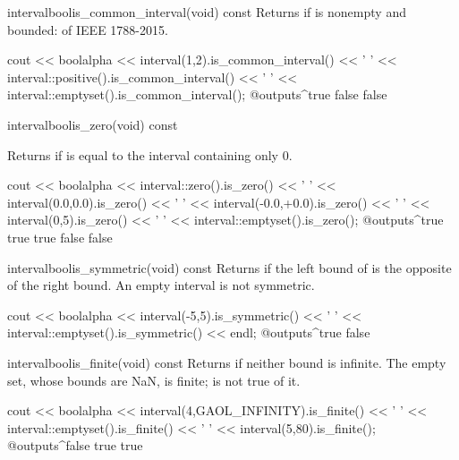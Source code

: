 \documentclass[12pt,a4paper,twoside,openright]{book}
\begin{document}
\begin{defmethod}{interval}{bool}{is\_common\_interval}{(void) const}
  Returns  if  is nonempty and bounded:
   of IEEE 1788-2015.\newinvfive
  \begin{example}
cout << boolalpha << interval(1,2).is_common_interval() << ' '
     << interval::positive().is_common_interval() << ' '
     << interval::emptyset().is_common_interval();
@outputs^true false false~
  \end{example}
\end{defmethod}

\begin{defmethod}{interval}{bool}{is\_zero}{(void) const}
  \begin{operation}
  \end{operation}
  Returns  if  is equal to the interval containing
  only $0$.
  \begin{example}
cout << boolalpha << interval::zero().is_zero() << ' '
     << interval(0.0,0.0).is_zero() << ' '
     << interval(-0.0,+0.0).is_zero() << ' '
     << interval(0,5).is_zero() << ' '
     << interval::emptyset().is_zero();
@outputs^true true true false false~
  \end{example}
\end{defmethod}

\begin{defmethod}{interval}{bool}{is\_symmetric}{(void) const}
  Returns  if the left bound of  is the opposite of
  the right bound. An empty interval is not symmetric.

\begin{example}
cout << boolalpha << interval(-5,5).is_symmetric() << ' '
     << interval::emptyset().is_symmetric() << endl;
@outputs^true false~
\end{example}
\end{defmethod}

\begin{defmethod}{interval}{bool}{is\_finite}{(void) const}
  Returns  if neither bound is infinite. The empty set, whose
  bounds are NaN, is finite;  is not true of
  it.

\begin{example}
cout << boolalpha << interval(4,GAOL_INFINITY).is_finite() << ' '
     << interval::emptyset().is_finite() << ' '
     << interval(5,80).is_finite();
@outputs^false true true~
\end{example}
\end{defmethod}
\end{document}
